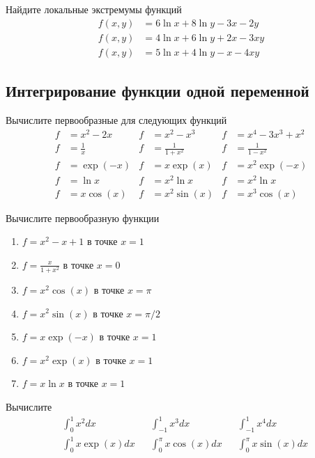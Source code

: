\begin{exercise}
Найдите локальные экстремумы функций
\begin{align*}
	f(x,y) &= 6\ln x+8\ln y-3x-2y \\
	f(x,y) &= 4\ln x+6\ln y+2x-3xy \\
	f(x,y) &= 5\ln x+4\ln y-x-4xy
\end{align*}
\end{exercise}

\subsection{Интегрирование функции одной переменной}

\begin{exercise}
Вычислите первообразные для следующих функций
\begin{align*}
	f&=x^2-2x & f&=x^2-x^3 & f&=x^4-3x^3+x^2\\ 
	f&=\frac 1x & f&=\frac{1}{1+x^2} & f&=\frac{1}{1-x^2} \\
	f&=\exp(-x) & f&=x\exp(x) & f&=x^2\exp(-x) \\
	f&=\ln x & f&=x^2\ln x & f&=x^2\ln x \\
	f&=x\cos(x) & f&=x^2\sin(x) & f&=x^3\cos(x)
\end{align*}
\end{exercise}

\begin{exercise}
Вычислите первообразную функции
\begin{enumerate}
	\item \(f=x^2-x+1\) в точке \(x=1\)
	\item \(f=\frac{x}{1+x^2}\) в точке \(x=0\)
	\item \(f=x^2\cos(x)\) в точке \(x=\pi\)
	\item \(f=x^2\sin(x)\) в точке \(x=\pi/2\)
	\item \(f=x\exp(-x)\) в точке \(x=1\)
	\item \(f=x^2\exp(x)\) в точке \(x=1\)
	\item \(f=x\ln x\) в точке \(x=1\)
\end{enumerate}
\end{exercise}

\begin{exercise}
Вычислите
\begin{align*}
	&\int_0^1 x^2dx & &\int_{-1}^1x^3 dx & &\int_{-1}^1x^4dx \\
	&\int_0^1 x\exp(x)dx & &\int_0^\pi x\cos(x)dx & &\int_0^\pi x\sin(x)dx
\end{align*}
\end{exercise}
